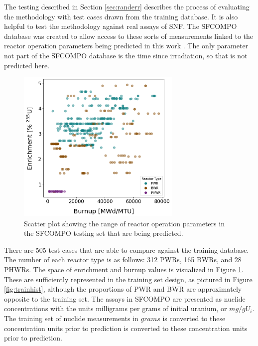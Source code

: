 
The testing described in Section \ref{sec:randerr} describes the process of
evaluating the methodology with test cases drawn from the training database.
It is also helpful to test the methodology against real assays of \gls{SNF}.
The \gls{SFCOMPO} database was created to allow access to these sorts of
measurements linked to the reactor operation parameters being predicted in this
work \cite{sfcompo, valid_sfco}. The only parameter not part of the
\gls{SFCOMPO} database is the time since irradiation, so that is not predicted
here. 

\begin{figure}[!htb]
  \centering
  \includegraphics[width=0.7\textwidth]{./chapters/exp1/sfcompo_scatter_viz.png}
  \caption[Scatter plot of distribution of \acrshort{SFCOMPO} testing set 
           labels]
          {Scatter plot showing the range of reactor operation parameters in 
           the \acrshort{SFCOMPO} testing set that are being predicted.}
  \label{fig:sfcoscatter}
\end{figure}

There are 505 test cases that are able to compare against the training
database.  The number of each reactor type is as follows: 312 \gls{PWR}s, 165
\gls{BWR}s, and 28 \gls{PHWR}s. The space of enrichment and burnup values is
visualized in Figure \ref{fig:sfcoscatter}. These are sufficiently represented
in the training set design, as pictured in Figure \ref{fig:trainhist}, although
the proportions of \gls{PWR} and \gls{BWR} are approximately opposite to the
training set. The assays in \gls{SFCOMPO} are presented as nuclide
concentrations with the units milligrams per grams of initial uranium, or
$mg/gU_i$. The training set of nuclide measurements in $grams$ is converted to
these concentration units prior to prediction is converted to these
concentration units prior to prediction. 

